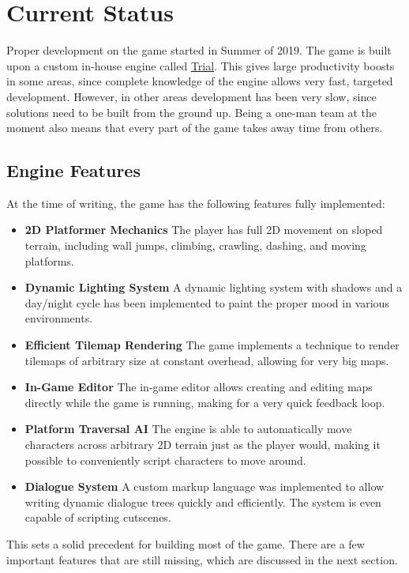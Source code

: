 \section{Current Status}
Proper development on the game started in Summer of 2019. The game is built upon a custom in-house engine called \href{https://shirakumo.org/trial}{Trial}. This gives large productivity boosts in some areas, since complete knowledge of the engine allows very fast, targeted development. However, in other areas development has been very slow, since solutions need to be built from the ground up. Being a one-man team at the moment also means that every part of the game takes away time from others.

\subsection{Engine Features}
At the time of writing, the game has the following features fully implemented:

\begin{itemize}
\item \textbf{2D Platformer Mechanics}\quad
  The player has full 2D movement on sloped terrain, including wall jumps, climbing, crawling, dashing, and moving platforms.
\item \textbf{Dynamic Lighting System}\quad
  A dynamic lighting system with shadows and a day/night cycle has been implemented to paint the proper mood in various environments.
\item \textbf{Efficient Tilemap Rendering}\quad
  The game implements a technique to render tilemaps of arbitrary size at constant overhead, allowing for very big maps.
\item \textbf{In-Game Editor}\quad
  The in-game editor allows creating and editing maps directly while the game is running, making for a very quick feedback loop.
\item \textbf{Platform Traversal AI}\quad
  The engine is able to automatically move characters across arbitrary 2D terrain just as the player would, making it possible to conveniently script characters to move around.
\item \textbf{Dialogue System}\quad
  A custom markup language was implemented to allow writing dynamic dialogue trees quickly and efficiently. The system is even capable of scripting cutscenes.
\end{itemize}

This sets a solid precedent for building most of the game. There are a few important features that are still missing, which are discussed in the next section.

